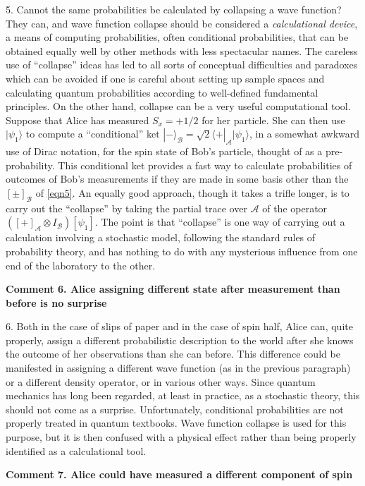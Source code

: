 \documentclass[10pt]{article} %
\def\outl#1{\par{\medskip\noindent\hspace*{.5cm}\bf
      \mathversion{bold}#1\mathversion{normal}\smallskip} }
\def\np{} \def\xa{} \def\xb{} \def\xn{} \def\xp{}
\def\outl#1{} \def\np{} \def\xa{} \def\xb{} \def\xn{} \def\xp{}
\def\outl#1{\par{\medskip\noindent\hspace*{.5cm}\bf
      \mathversion{bold}#1\mathversion{normal}\smallskip} }
\def\np{\newpage }\def\xn{\nopagebreak }\def\xp{\pagebreak }
\newcommand{\bra}[1]{\lgl#1|}
\newcommand{\ket}[1]{|#1\rgl }
\newcommand{\lgl}{\langle }
\newcommand{\ot}{\otimes }
\newcommand{\rgl}{\rangle }
\newcommand{\st}{\sqrt{2}}
\newcommand{\AM}{{\mathcal A}}
\newcommand{\BM}{{\mathcal B}}
\begin{document}
5. Cannot the same probabilities be calculated by collapsing a wave function?
They can, and wave function collapse should be considered a
\emph{calculational device}, a means of computing probabilities, often
conditional probabilities, that can be obtained equally well by other methods
with less spectacular names.  The careless use of ``collapse'' ideas has led
to all sorts of conceptual difficulties and paradoxes which can be avoided if
one is careful about setting up sample spaces and calculating quantum
probabilities according to well-defined fundamental principles.  On the other
hand, collapse can be a very useful computational tool.  Suppose that Alice
has measured $S_x=+1/2$ for her particle.  She can then use $\ket{\psi_1}$ to
compute a ``conditional'' ket $\ket{-}_\BM =\st\bra{+}_\AM\ket{\psi_1}$, in a
somewhat awkward use of Dirac notation, for the spin state of Bob's particle,
thought of as a pre-probability.  This conditional ket provides a fast way to
calculate probabilities of outcomes of Bob's measurements if they are made in
some basis other than the $[\pm]_\BM$ of \eqref{eqn5}.  An equally good
approach, though it takes a trifle longer, is to carry out the ``collapse'' by
taking the partial trace over $\AM$ of the operator $([+]_\AM \ot I_\BM)
[\psi_1]$. The point is that ``collapse'' is one way of carrying out a
calculation involving a stochastic model, following the standard rules of
probability theory, and has nothing to do with any mysterious influence from
one end of the laboratory to the other.

\xb 
\outl{Comment 6. Alice assigning different state after measurement than
  before is no surprise} 
\xa
 


6. Both in the case of slips of paper and in the case of spin half, Alice can,
quite properly, assign a different probabilistic description to the world
after she knows the outcome of her observations than she can before.  This
difference could be manifested in assigning a different wave function (as in
the previous paragraph) or a different density operator, or in various other
ways.  Since quantum mechanics has long been regarded, at least in practice,
as a stochastic theory, this should not come as a surprise.  Unfortunately,
conditional probabilities are not properly treated in quantum textbooks.  Wave
function collapse is used for this purpose, but it is then confused with a
physical effect rather than being properly identified as a calculational tool.

\xb 
\outl{Comment 7. Alice could have measured a different component of spin}
\xa
\end{document}
